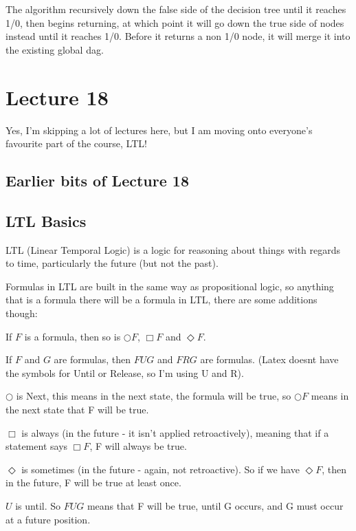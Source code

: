 \documentclass[11pt,a4paper]{article}
\begin{document}
The algorithm recursively down the false side of the decision tree until it reaches 1/0, then begins returning, at which point it will go down the true side of nodes instead until it reaches 1/0. Before it returns a non 1/0 node, it will merge it into the existing global dag.

\section{Lecture 18}
Yes, I'm skipping a lot of lectures here, but I am moving onto everyone's favourite part of the course, LTL!

\subsection{Earlier bits of Lecture 18}

\subsection{LTL Basics}

LTL (Linear Temporal Logic) is a logic for reasoning about things with regards to time, particularly the future (but not the past).

Formulas in LTL are built in the same way as propositional logic, so anything that is a formula there will be a formula in LTL, there are some additions though:

If $F$ is a formula, then so is $\bigcirc F$, $\Box F$ and $\Diamond F$.

If $F$ and $G$ are formulas, then $F U G$ and $F R G$ are formulas. (Latex doesnt have the symbols for Until or Release, so I'm using U and R).

\vspace{5pt}
$\bigcirc$ is Next, this means in the next state, the formula will be true, so $\bigcirc F$ means in the next state that F will be true.

\vspace{5pt}
$\Box$ is always (in the future - it isn't applied retroactively), meaning that if a statement says $\Box F$, F will always be true.

\vspace{5pt}
$\Diamond$ is sometimes (in the future - again, not retroactive). So if we have $\Diamond F$, then in the future, F will be true at least once.

\vspace{5pt}
$U$ is until. So $F U G$ means that F will be true, until G occurs, and G must occur at a future position.
\end{document}
